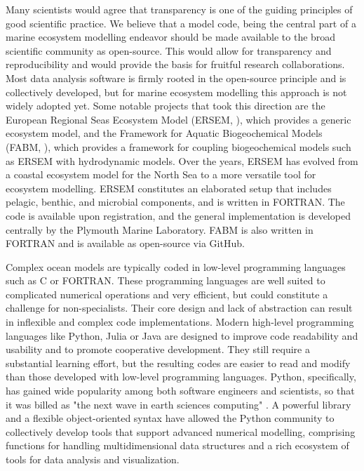 \documentclass[journal abbreviation, manuscript]{copernicus}
\begin{document}
Many scientists would agree that transparency is one of the guiding principles of good scientific practice. We believe that a model code, being the central part of a marine ecosystem modelling endeavor should be made available to the broad scientific community as open-source. This would allow for transparency and reproducibility and would provide the basis for fruitful research collaborations. Most data analysis software is firmly rooted in the open-source principle and is collectively developed, but for marine ecosystem modelling this approach is not widely adopted yet. Some notable projects that took this direction are the European Regional Seas Ecosystem Model (ERSEM, \citet{Butenschon2016}), which provides a generic ecosystem model, and the Framework for Aquatic Biogeochemical Models (FABM, \citet{Bruggeman2014a}), which provides a framework for coupling biogeochemical models such as ERSEM with hydrodynamic models. Over the years, ERSEM has evolved from a coastal ecosystem model for the North Sea to a more versatile tool for ecosystem modelling. ERSEM constitutes an elaborated setup that includes pelagic, benthic, and microbial components, and is written in FORTRAN. The code is available upon registration, and the general implementation is developed centrally by the Plymouth Marine Laboratory. FABM is also written in FORTRAN and is available as open-source via GitHub.

Complex ocean models are typically coded in low-level programming languages such as C or FORTRAN. These programming languages are well suited to complicated numerical operations and very efficient, but could constitute a challenge for non-specialists. Their core design and lack of abstraction can result in inflexible and complex code implementations.
Modern high-level programming languages like Python, Julia or Java are designed to improve code readability and usability and to promote cooperative development. They still require a substantial learning effort, but the resulting codes are easier to read and modify than those developed with low-level programming languages. Python, specifically, has gained wide popularity among both software engineers and scientists, so that it was billed as "the next wave in earth sciences computing" \citep{Lin2012}. A powerful library and a flexible object-oriented syntax have allowed the Python community to collectively develop tools that support advanced numerical modelling, comprising functions for handling multidimensional data structures and a rich ecosystem of tools for data analysis and visualization.
\end{document}
